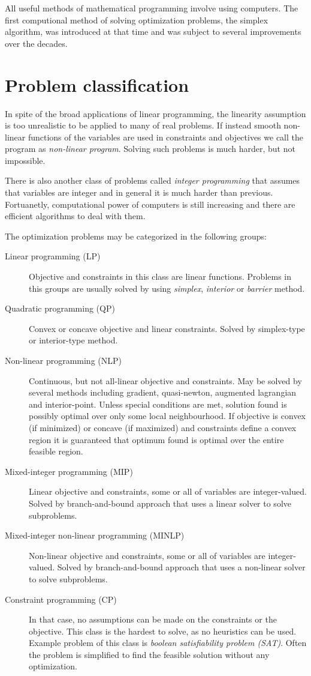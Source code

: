 All useful methods of mathematical programming involve using computers. The first computional method of solving optimization problems, the simplex algorithm, was introduced at that time and was subject to several improvements over the decades.

\section{Problem classification}
\label{sec:ampl:classification}

In spite of the broad applications of linear programming, the linearity assumption is too unrealistic to be applied to many of real problems. If instead smooth non-linear functions of the variables are used in constraints and objectives we call the program as \emph{non-linear program}. Solving such problems is much harder, but not impossible.

There is also another class of problems called \emph{integer programming} that assumes that variables are integer and in general it is much harder than previous. Fortuanetly, computational power of computers is still increasing and there are efficient algorithms to deal with them.

The optimization problems may be categorized in the following groups:
\begin{description}
  \item[Linear programming (LP)] Objective and constraints in this class are linear functions. Problems in this groups are usually solved by using \emph{simplex}, \emph{interior} or \emph{barrier} method.
  \item[Quadratic programming (QP)] Convex or concave objective and linear constraints. Solved by simplex-type or interior-type method.
  \item[Non-linear programming (NLP)] Continuous, but not all-linear objective and constraints. May be solved by several methods including gradient, quasi-newton, augmented lagrangian and interior-point. Unless special conditions are met, solution found is possibly optimal over only some local neighbourhood. If objective is convex (if minimized) or concave (if maximized) and constraints define a convex region it is guaranteed that optimum found is optimal over the entire feasible region.
  \item[Mixed-integer programming (MIP)] Linear objective and constraints, some or all of variables are integer-valued. Solved by branch-and-bound approach that uses a linear solver to solve subproblems.
  \item[Mixed-integer non-linear programming (MINLP)] Non-linear objective and constraints, some or all of variables are integer-valued. Solved by branch-and-bound approach that uses a non-linear solver to solve subproblems.
  \item[Constraint programming (CP)] In that case, no assumptions can be made on the constraints or the objective. This class is the hardest to solve, as no heuristics can be used. Example problem of this class is \emph{boolean satisfiability problem (SAT)}. Often the problem is simplified to find the feasible solution without any optimization.
\end{description}

